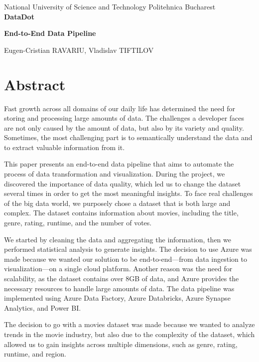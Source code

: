 \documentclass[a4paper,12pt]{article}
\author{Eugen-Cristian RAVARIU, Vladislav TIFTILOV}
\begin{document}
\begin{titlepage}
    \centering
    National University of Science and Technology Politehnica Bucharest\\
    \vfill
    {\bfseries\fontsize{14pt}{14pt} DataDot}\par
    \vspace{0.5cm}
    {\bfseries\fontsize{12pt}{12pt} End-to-End Data Pipeline}\par
    \vspace{2.5cm}
    Eugen-Cristian RAVARIU, Vladislav TIFTILOV\\
    \vfill
    \date{\today}
\end{titlepage}

\section{Abstract}
\label{sec:abstract}

Fast growth across all domains of our daily life has determined the need for storing and processing 
large amounts of data. The challenges a developer faces are not only caused by the amount of data, 
but also by its variety and quality. Sometimes, the most challenging part is to semantically understand 
the data and to extract valuable information from it.

This paper presents an end-to-end data pipeline that aims to automate the process of data transformation 
and visualization. During the project, we discovered the importance of data quality, which led us to change 
the dataset several times in order to get the most meaningful insights. To face real challenges of the 
big data world, we purposely chose a dataset that is both large and complex. The dataset contains 
information about movies, including the title, genre, rating, runtime, and the number of votes.

We started by cleaning the data and aggregating the information, then we performed statistical 
analysis to generate insights. The decision to use Azure was made because we wanted our solution 
to be end-to-end—from data ingestion to visualization—on a single cloud platform. Another reason 
was the need for scalability, as the dataset contains over 8GB of data, and Azure provides the 
necessary resources to handle large amounts of data. The data pipeline was implemented using 
Azure Data Factory, Azure Databricks, Azure Synapse Analytics, and Power BI.

The decision to go with a movies dataset was made because we wanted to analyze trends in 
the movie industry, but also due to the complexity of the dataset, which allowed us to gain 
insights across multiple dimensions, such as genre, rating, runtime, and region.
\end{document}
